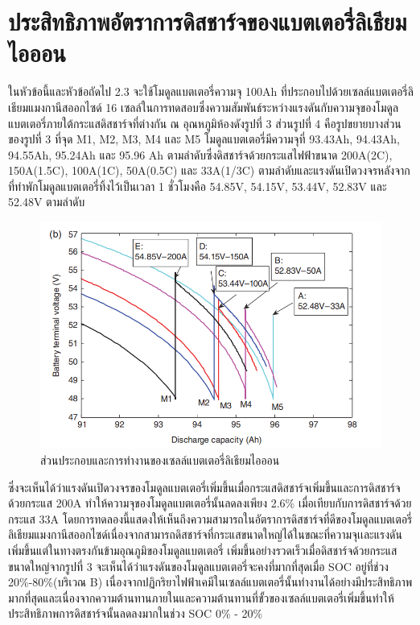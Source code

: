 \section{ประสิทธิภาพอัตราการดิสชาร์จของแบตเตอรี่ลิเธียมไอออน}
ในหัวข้อนี้และหัวข้อถัดไป 2.3 จะใช้โมดูลแบตเตอรี่ความจุ 100Ah ที่ประกอบไปด้วยเซลล์แบตเตอรี่ลิเธียมแมงกานีสออกไซด์ 16 เซลล์ในการทดสอบซึ่งความสัมพันธ์ระหว่างแรงดันกับความจุของโมดูลแบตเตอรี่ภายใต้กระแสดิสชาร์จที่ต่างกัน ณ อุณหภูมิห้องดังรูปที่ 3 ส่วนรูปที่ 4 คือรูปขยายบางส่วนของรูปที่ 3 ที่จุด M1, M2, M3, M4 และ M5 โมดูลแบตเตอรี่มีความจุที่ 93.43Ah, 94.43Ah, 94.55Ah, 95.24Ah และ 95.96 Ah ตามลำดับซึ่งดิสชาร์จด้วยกระแสไฟฟ้าขนาด 200A(2C), 150A(1.5C), 100A(1C), 50A(0.5C) และ 33A(1/3C) ตามลำดับและแรงดันเปิดวงจรหลังจากที่ทำพักโมดูลแบตเตอรี่ทิ้งไว้เป็นเวลา 1 ชั่วโมงคือ 54.85V, 54.15V, 53.44V, 52.83V และ 52.48V ตามลำดับ\newline
\begin{center}
	\begin{figure}[!h]
		\includegraphics[width=0.6\linewidth]{Chapters/img/IV_b.png}
			\centering
			\captionsetup{justification=centering,margin=2cm}
			\caption{ส่วนประกอบและการทำงานของเซลล์แบตเตอรี่ลิเธียมไอออน}
	\end{figure}
\end{center}
ซึ่งจะเห็นได้ว่าแรงดันเปิดวงจรของโมดูลแบตเตอรี่เพิ่มขึ้นเมื่อกระแสดิสชาร์จเพิ่มขึ้นและการดิสชาร์จด้วยกระแส 200A ทำให้ความจุของโมดูลแบตเตอรี่นั้นลดลงเพียง 2.6\% เมื่อเทียบกับการดิสชาร์จด้วยกระแส 33A โดยการทดลองนี้แสดงให้เห็นถึงความสามารถในอัตราการดิสชาร์จที่ดีของโมดูลแบตเตอรี่ลิเธียมแมงกานีสออกไซด์เนื่องจากสามารถดิสชาร์จที่กระแสขนาดใหญ่ได้ในขณะที่ความจุเเละแรงดันเพิ่มขึ้นแต่ในทางตรงกันข้ามอุณภูมิของโมดูลแบตเตอรี่
เพิ่มขึ้นอย่างรวดเร็วเมื่อดิสชาร์จด้วยกระแสขนาดใหญ่จากรูปที่ 3 จะเห็นได้ว่าแรงดันของโมดูลแบตเตอรี่จะคงที่มากที่สุดเมื่อ SOC อยู่ที่ช่วง 20\%-80\%(บริเวณ B) เนื่องจากปฏิกริยาไฟฟ้าเคมีในเซลล์แบตเตอรี่นั้นทำงานได้อย่างมีประสิทธิภาพมากที่สุดและเนื่องจากความต้านทานภายในและความต้านทานที่ขั้วของเซลล์แบตเตอรี่เพิ่มขึ้นทำให้ประสิทธิภาพการดิสชาร์จนั้นลดลงมากในช่วง SOC 0\% - 20\%
